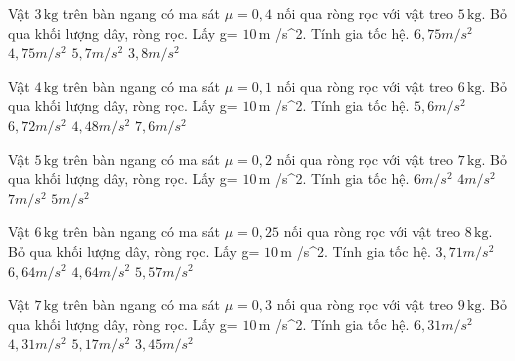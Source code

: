 \begin{ex}
Vật $3\,\text{kg}$ trên bàn ngang có ma sát $\mu=0,4$ nối qua ròng rọc với vật treo $5\,\text{kg}$. Bỏ qua khối lượng dây, ròng rọc. Lấy g= $10\,\text{m}$ /s^2. Tính gia tốc hệ.
\choice
{$6,75 m/s^2$}
{\True $4,75 m/s^2$}
{$5,7 m/s^2$}
{$3,8 m/s^2$}
\end{ex}

\begin{ex}
Vật $4\,\text{kg}$ trên bàn ngang có ma sát $\mu=0,1$ nối qua ròng rọc với vật treo $6\,\text{kg}$. Bỏ qua khối lượng dây, ròng rọc. Lấy g= $10\,\text{m}$ /s^2. Tính gia tốc hệ.
\choice
{\True $5,6 m/s^2$}
{$6,72 m/s^2$}
{$4,48 m/s^2$}
{$7,6 m/s^2$}
\end{ex}

\begin{ex}
Vật $5\,\text{kg}$ trên bàn ngang có ma sát $\mu=0,2$ nối qua ròng rọc với vật treo $7\,\text{kg}$. Bỏ qua khối lượng dây, ròng rọc. Lấy g= $10\,\text{m}$ /s^2. Tính gia tốc hệ.
\choice
{$6 m/s^2$}
{$4 m/s^2$}
{$7 m/s^2$}
{\True $5 m/s^2$}
\end{ex}

\begin{ex}
Vật $6\,\text{kg}$ trên bàn ngang có ma sát $\mu=0,25$ nối qua ròng rọc với vật treo $8\,\text{kg}$. Bỏ qua khối lượng dây, ròng rọc. Lấy g= $10\,\text{m}$ /s^2. Tính gia tốc hệ.
\choice
{$3,71 m/s^2$}
{$6,64 m/s^2$}
{\True $4,64 m/s^2$}
{$5,57 m/s^2$}
\end{ex}

\begin{ex}
Vật $7\,\text{kg}$ trên bàn ngang có ma sát $\mu=0,3$ nối qua ròng rọc với vật treo $9\,\text{kg}$. Bỏ qua khối lượng dây, ròng rọc. Lấy g= $10\,\text{m}$ /s^2. Tính gia tốc hệ.
\choice
{$6,31 m/s^2$}
{\True $4,31 m/s^2$}
{$5,17 m/s^2$}
{$3,45 m/s^2$}
\end{ex}

